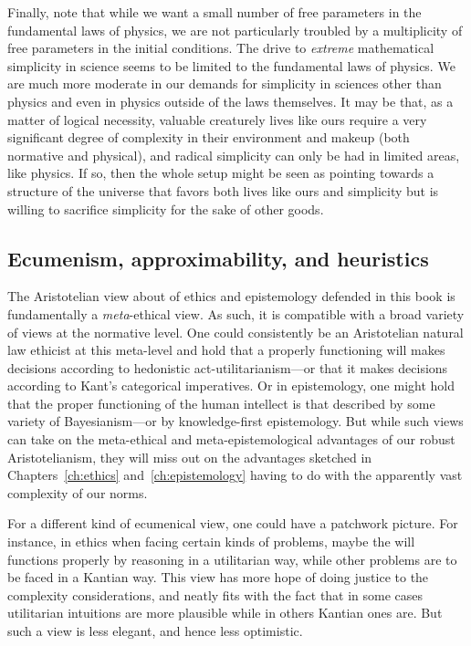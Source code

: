Finally, note that while we want a small number of free parameters in the fundamental laws of physics, we are not
particularly troubled by a multiplicity of free parameters in the initial conditions. The drive to \textit{extreme}
mathematical simplicity in science seems to be limited to the fundamental laws of physics. We are much more
moderate in our demands for simplicity in sciences other than physics and even in physics outside of the laws
themselves. It may be that, as a matter of logical necessity, valuable creaturely lives like ours require a
very significant degree of complexity in their environment and makeup (both normative and physical), and radical
simplicity can only be had in limited areas, like physics. If so, then the whole setup might be seen as pointing 
towards a structure of the universe that favors both lives like ours and simplicity but is willing to sacrifice 
simplicity for the sake of other goods.

\subsection{Ecumenism, approximability, and heuristics}\label{sec:approx}
The Aristotelian view about of ethics and epistemology defended in this book is 
fundamentally a \textit{meta}-ethical view. As such, it is compatible with a broad variety of views at
the normative level. One could consistently be an Aristotelian natural law ethicist at this meta-level 
and hold that a properly functioning will makes decisions according to hedonistic act-utilitarianism---or
that it makes decisions according to Kant's categorical imperatives. Or in epistemology, one might hold
that the proper functioning of the human intellect is that described by some variety of Bayesianism---or
by knowledge-first epistemology. But while such views can take on
the meta-ethical and meta-epistemological advantages of our robust Aristotelianism, they will miss out on 
the advantages sketched in Chapters~\ref{ch:ethics} and~\ref{ch:epistemology} having to do with the apparently 
vast complexity of our norms.

For a different kind of ecumenical view, one could have a patchwork picture. For instance, in ethics when facing
certain kinds of problems, maybe the will functions properly by reasoning in a utilitarian way, while other
problems are to be faced in a Kantian way. This view has more hope of doing justice to the complexity
considerations, and neatly fits with the fact that in some cases utilitarian intuitions are more
plausible while in others Kantian ones are. But such a view is less elegant, and hence less optimistic. 


